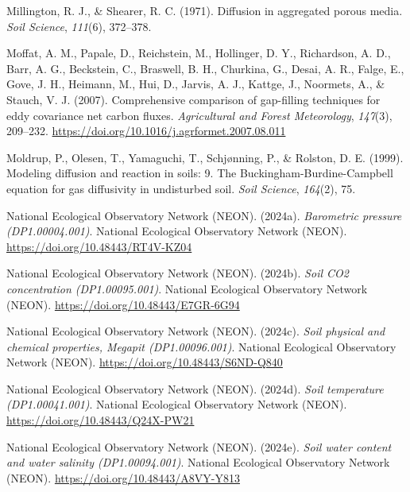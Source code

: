 \documentclass[
  letterpaper,
  DIV=11,
  numbers=noendperiod]{scrartcl}
\newlength{\cslhangindent}
\newenvironment{CSLReferences}[2] %
 {\begin{list}{}{%
  \setlength{\itemindent}{0pt}
  \setlength{\leftmargin}{0pt}
  \setlength{\parsep}{0pt}
  \ifodd #1
   \setlength{\leftmargin}{\cslhangindent}
   \setlength{\itemindent}{-1\cslhangindent}
  \fi
  \setlength{\itemsep}{#2\baselineskip}}}
 {\end{list}}
\begin{document}
\begin{CSLReferences}{1}{0}
Millington, R. J., \& Shearer, R. C. (1971). Diffusion in aggregated
porous media. \emph{Soil Science}, \emph{111}(6), 372--378.

Moffat, A. M., Papale, D., Reichstein, M., Hollinger, D. Y., Richardson,
A. D., Barr, A. G., Beckstein, C., Braswell, B. H., Churkina, G., Desai,
A. R., Falge, E., Gove, J. H., Heimann, M., Hui, D., Jarvis, A. J.,
Kattge, J., Noormets, A., \& Stauch, V. J. (2007). Comprehensive
comparison of gap-filling techniques for eddy covariance net carbon
fluxes. \emph{Agricultural and Forest Meteorology}, \emph{147}(3),
209--232. \url{https://doi.org/10.1016/j.agrformet.2007.08.011}

Moldrup, P., Olesen, T., Yamaguchi, T., Schjønning, P., \& Rolston, D.
E. (1999). Modeling diffusion and reaction in soils: 9. {The
Buckingham-Burdine-Campbell} equation for gas diffusivity in undisturbed
soil. \emph{Soil Science}, \emph{164}(2), 75.

National Ecological Observatory Network (NEON). (2024a).
\emph{Barometric pressure ({DP1}.00004.001)}. National Ecological
Observatory Network (NEON). \url{https://doi.org/10.48443/RT4V-KZ04}

National Ecological Observatory Network (NEON). (2024b). \emph{Soil
{CO2} concentration ({DP1}.00095.001)}. National Ecological Observatory
Network (NEON). \url{https://doi.org/10.48443/E7GR-6G94}

National Ecological Observatory Network (NEON). (2024c). \emph{Soil
physical and chemical properties, {Megapit} ({DP1}.00096.001)}. National
Ecological Observatory Network (NEON).
\url{https://doi.org/10.48443/S6ND-Q840}

National Ecological Observatory Network (NEON). (2024d). \emph{Soil
temperature ({DP1}.00041.001)}. National Ecological Observatory Network
(NEON). \url{https://doi.org/10.48443/Q24X-PW21}

National Ecological Observatory Network (NEON). (2024e). \emph{Soil
water content and water salinity ({DP1}.00094.001)}. National Ecological
Observatory Network (NEON). \url{https://doi.org/10.48443/A8VY-Y813}


\end{CSLReferences}
\end{document}
